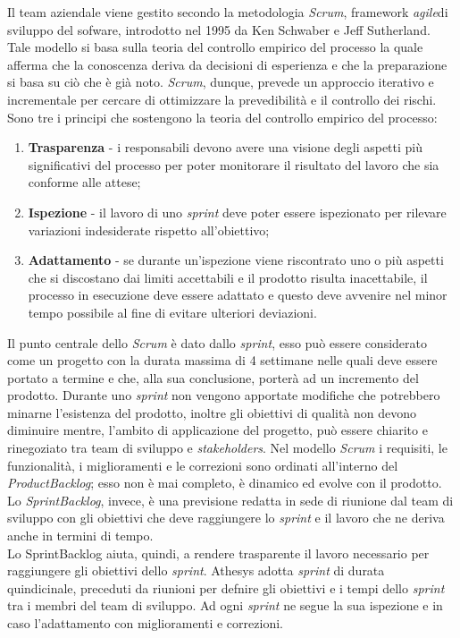 Il team aziendale viene gestito secondo la metodologia \emph{\gls{Scrum}}\glsfirstoccur, framework \emph{\gls{agile}}\glsfirstoccur di sviluppo del sofware, introdotto nel 1995 da Ken Schwaber e Jeff Sutherland. Tale modello si basa sulla teoria del controllo empirico del processo la quale afferma che la conoscenza deriva da decisioni di esperienza e che la preparazione si basa su ciò che è già noto. \textit{Scrum}, dunque, prevede un approccio iterativo e incrementale per cercare di ottimizzare la prevedibilità e il controllo dei rischi. Sono tre i principi che sostengono la teoria del controllo empirico del processo:
\begin{enumerate}
	\item \textbf{Trasparenza} - i responsabili devono avere una visione degli aspetti più significativi del processo per poter monitorare il risultato del lavoro che sia conforme alle attese;
	\item \textbf{Ispezione} - il lavoro di uno \textit{sprint} deve poter essere ispezionato per rilevare variazioni indesiderate rispetto all'obiettivo;
	\item \textbf{Adattamento} - se durante un'ispezione viene riscontrato uno o più aspetti che si discostano dai limiti accettabili e il prodotto risulta inacettabile, il processo in esecuzione deve essere adattato e questo deve avvenire nel minor tempo possibile al fine di evitare ulteriori deviazioni.
\end{enumerate}
Il punto centrale dello \textit{Scrum} è dato dallo \textit{sprint}, esso può essere considerato come un progetto con la durata massima di 4 settimane nelle quali deve essere portato a termine e che, alla sua conclusione, porterà ad un incremento del prodotto. Durante uno \textit{sprint} non vengono apportate modifiche che potrebbero minarne l'esistenza del prodotto, inoltre gli obiettivi di qualità non devono diminuire mentre, l'ambito di applicazione del progetto, può essere chiarito e rinegoziato tra team di sviluppo e \textit{stakeholders}. Nel modello \textit{Scrum} i requisiti, le funzionalità, i miglioramenti e le correzioni sono ordinati all'interno del \emph{\gls{ProductBacklog}}\glsfirstoccur; esso non è mai completo, è dinamico ed evolve con il prodotto.\\
Lo \emph{\gls{SprintBacklog}}\glsfirstoccur, invece, è una previsione redatta in sede di riunione dal team di sviluppo con gli obiettivi che deve raggiungere lo \textit{sprint} e il lavoro che ne deriva anche in termini di tempo.\\
Lo \gls{SprintBacklog} aiuta, quindi, a rendere trasparente il lavoro necessario per raggiungere gli obiettivi dello \textit{sprint}.
Athesys adotta \textit{sprint} di durata quindicinale, preceduti da riunioni per defnire gli obiettivi e i tempi dello \textit{sprint} tra i membri del team di sviluppo. Ad ogni \textit{sprint} ne segue la sua ispezione e in caso l'adattamento con miglioramenti e correzioni.

